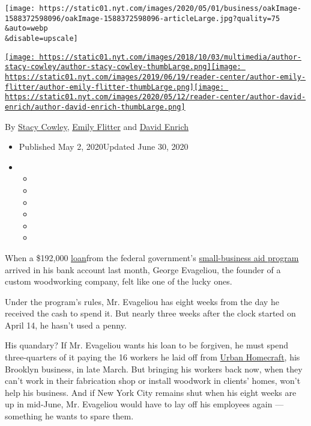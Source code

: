 \texttt{[image: https://static01.nyt.com/images/2020/05/01/business/oakImage-1588372598096/oakImage-1588372598096-articleLarge.jpg?quality=75\\\&auto=webp\\\&disable=upscale]}

\href{https://www.nytimes.com/by/stacy-cowley}{\texttt{[image: https://static01.nyt.com/images/2018/10/03/multimedia/author-stacy-cowley/author-stacy-cowley-thumbLarge.png]}}\href{https://www.nytimes.com/by/emily-flitter}{\texttt{[image: https://static01.nyt.com/images/2019/06/19/reader-center/author-emily-flitter/author-emily-flitter-thumbLarge.png]}}\href{https://www.nytimes.com/by/david-enrich}{\texttt{[image: https://static01.nyt.com/images/2020/05/12/reader-center/author-david-enrich/author-david-enrich-thumbLarge.png]}}

By \href{https://www.nytimes.com/by/stacy-cowley}{Stacy Cowley},
\href{https://www.nytimes.com/by/emily-flitter}{Emily Flitter} and
\href{https://www.nytimes.com/by/david-enrich}{David Enrich}

\begin{itemize}
\item
  Published May 2, 2020Updated June 30, 2020
\item
  \begin{itemize}
  \item
  \item
  \item
  \item
  \item
  \item
  \end{itemize}
\end{itemize}

When a \$192,000
\href{https://www.nytimes.com/2020/05/13/business/paycheck-protection-program-small-business.html}{loan}from
the federal government's
\href{https://www.nytimes.com/2020/05/13/business/paycheck-protection-program-small-business.html}{small-business
aid program} arrived in his bank account last month, George Evageliou,
the founder of a custom woodworking company, felt like one of the lucky
ones.

Under the program's rules, Mr. Evageliou has eight weeks from the day he
received the cash to spend it. But nearly three weeks after the clock
started on April 14, he hasn't used a penny.

His quandary? If Mr. Evageliou wants his loan to be forgiven, he must
spend three-quarters of it paying the 16 workers he laid off from
\href{http://www.urbanhomecraft.com/about}{Urban Homecraft}, his
Brooklyn business, in late March. But bringing his workers back now,
when they can't work in their fabrication shop or install woodwork in
clients' homes, won't help his business. And if New York City remains
shut when his eight weeks are up in mid-June, Mr. Evageliou would have
to lay off his employees again --- something he wants to spare them.

